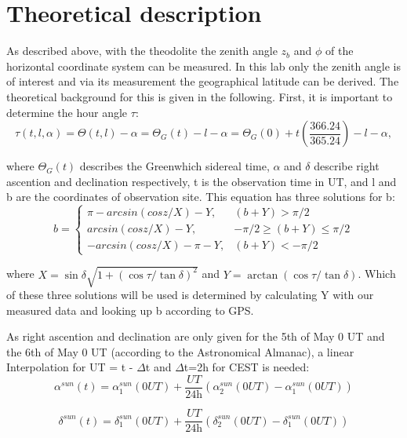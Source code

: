 
\chapter{Theoretical description}
\label{chap:fvz}

As described above, with the theodolite the zenith angle $z_b$ and $\phi$ of the horizontal coordinate system can be measured. In this lab only the zenith angle is of interest and via its measurement the geographical latitude can be derived. The theoretical background for this is given in the following. First, it is important to determine the hour angle $\tau$:
\begin{equation}
    \tau (t, l, \alpha)= \Theta (t, l) - \alpha = \Theta_G(t) - l - \alpha = \Theta_G(0) + t  \left( \frac{366.24}{365.24}\right) - l - \alpha, 
\end{equation}

where $\Theta_G(t)$ describes the Greenwhich sidereal time, $\alpha$ and $\delta$ describe right ascention and declination respectively, t is the observation time in UT, and l and b are the coordinates of observation site. This equation has three solutions for b:
\[
b = 
\begin{cases}
    \pi - arcsin(cos z/X) - Y, & (b + Y ) > \pi/2 \\
    arcsin(cos z/X) - Y, & -\pi/2 \ge (b + Y ) \le \pi/2 \\
    -arcsin(cos z/X) - \pi - Y, & (b + Y ) < - \pi/2
\end{cases}
\]

where $X = \sin \delta \sqrt{1+(\cos \tau / \tan \delta)^2}$ and $Y = \arctan(\cos \tau / \tan \delta)$. Which of these three solutions will be used is determined by calculating Y with our measured data and looking up b according to GPS. 

As right ascention and declination are only given for the 5th of May 0 UT and the 6th of May 0 UT (according to the Astronomical Almanac), a linear Interpolation for UT = t - $\Delta$t and $\Delta$t=2h for CEST is needed:
\begin{equation}
    \alpha^{sun}(t) = \alpha^{sun}_1(0UT) + \frac{UT}{\text{24h}}(\alpha^{sun}_2(0UT)-\alpha^{sun}_1(0UT))
\end{equation}

\begin{equation}
    \delta^{sun}(t) = \delta^{sun}_1(0UT) + \frac{UT}{\text{24h}}(\delta^{sun}_2(0UT)-\delta^{sun}_1(0UT))
\end{equation}

